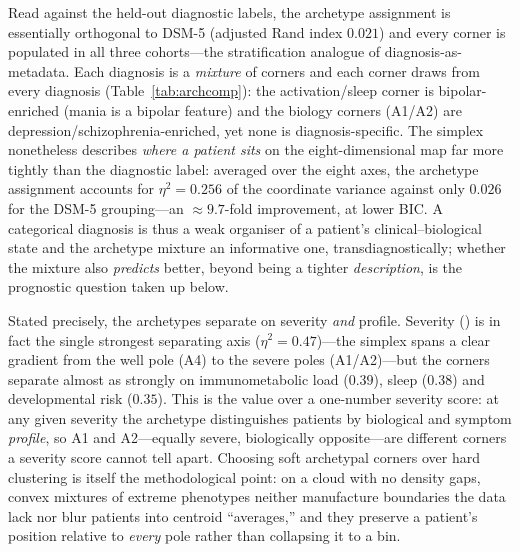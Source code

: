 Read against the held-out diagnostic labels, the archetype assignment is essentially
orthogonal to DSM-5 (adjusted Rand index $0.021$) and every corner is populated in all three
cohorts---the stratification analogue of diagnosis-as-metadata. Each diagnosis is a
\emph{mixture} of corners and each corner draws from every diagnosis (Table~\ref{tab:archcomp}):
the activation/sleep corner is bipolar-enriched (mania is a bipolar feature) and the biology
corners (A1/A2) are depression/schizophrenia-enriched, yet none is diagnosis-specific. The
simplex nonetheless describes \emph{where a patient sits} on the eight-dimensional map far more
tightly than the diagnostic label: averaged over the eight axes, the archetype assignment
accounts for $\eta^2=0.256$ of the coordinate variance against only $0.026$ for the DSM-5
grouping---an $\approx\!9.7$-fold improvement, at lower BIC. A categorical diagnosis is thus a
weak organiser of a patient's clinical--biological state and the archetype mixture an informative
one, transdiagnostically; whether the mixture also \emph{predicts} better, beyond being a tighter
\emph{description}, is the prognostic question taken up below.

Stated precisely, the archetypes separate on severity \emph{and} profile. Severity (\Gfac) is in
fact the single strongest separating axis ($\eta^2=0.47$)---the simplex spans a clear gradient
from the well pole (A4) to the severe poles (A1/A2)---but the corners separate almost as strongly
on immunometabolic load ($0.39$), sleep ($0.38$) and developmental risk ($0.35$). This is the
value over a one-number severity score: at any given severity the archetype distinguishes patients
by biological and symptom \emph{profile}, so A1 and A2---equally severe, biologically opposite---are
different corners a severity score cannot tell apart.  Choosing soft archetypal corners over hard clustering is
itself the methodological point: on a cloud with no density gaps, convex mixtures of extreme
phenotypes neither manufacture boundaries the data lack nor blur patients into centroid
``averages,'' and they preserve a patient's position relative to \emph{every} pole rather than
collapsing it to a bin.

